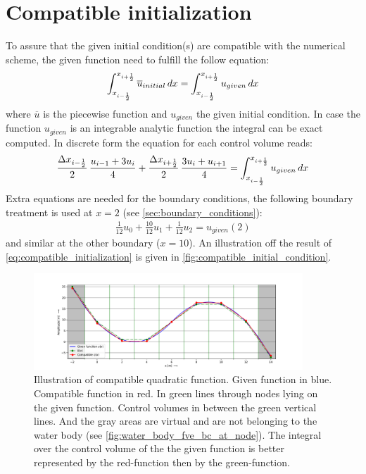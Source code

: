 \section{Compatible initialization}
To assure that the given initial condition(s) are compatible with the numerical scheme, the given function need to fulfill the follow equation:
\begin{align}
    \int_{x_{i-\frac{1}{2}}}^{x_{i+\frac{1}{2}}} \overline u_{initial}\, dx = \int_{x_{i-\frac{1}{2}}}^{x_{i+\frac{1}{2}}} u_{given}\, dx \label{eq:compatible_initialization}
\end{align}
where $\overline{u}$ is the piecewise function and $u_{given}$ the given initial condition.
In case the function $u_{given}$ is an integrable analytic function the integral can be exact computed.
In discrete form the equation for each control volume reads:
\begin{align}
    \frac{\Delta x_{i-\frac{1}{2}}}{2}\,\frac{u_{i-1} + 3 u_i}{4} +
    \frac{\Delta x_{i+\frac{1}{2}}}{2}\,\frac{3 u_i + u_{i+1}}{4} = \int_{x_{i-\frac{1}{2}}}^{x_{i+\frac{1}{2}}} u_{given}\, dx
\end{align}
Extra equations are needed for the boundary conditions, the following boundary treatment is used at $x=2$ (see  \autoref{sec:boundary_conditions}):
\begin{align}
    \frac{1}{12} u_0 + \frac{10}{12}u_1 + \frac{1}{12} u_2 = u_{given}(2)
\end{align}
and similar at the other boundary ($x=10$).
An illustration off the result of \autoref{eq:compatible_initialization} is given in \autoref{fig:compatible_initial_condition}.
\begin{figure}[H]
    \centering
    \includegraphics[width=0.9\textwidth]{figures/compatible_initialization_lx=12.0_dx=2.0.pdf}
    \caption[Illustration of compatible quadratic function]{Illustration of compatible quadratic function. Given function in blue. Compatible function in red. In green lines through nodes lying on the given function. Control volumes in between the green vertical lines. And the gray areas are virtual and are not belonging to the water body (see \autoref{fig:water_body_fve_bc_at_node}). The integral over the control volume of the the given function is better represented by the red-function then by the green-function. }\label{fig:compatible_initial_condition}
\end{figure}
